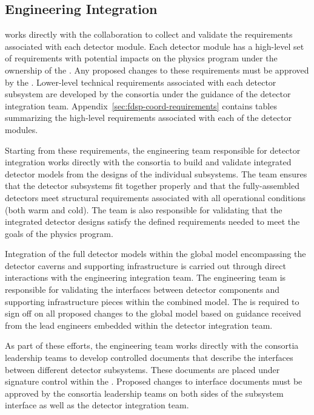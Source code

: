 \subsection{Engineering Integration}

  works directly with the collaboration to
collect and validate the requirements associated with each detector
module.  Each detector module has a high-level set of requirements
with potential impacts on the  physics program under
the ownership of the  .  Any proposed
changes to these requirements must be approved by the .
Lower-level technical requirements associated with each detector
subsystem are developed by the consortia under the guidance of
the  detector integration team.  Appendix~\ref{sec:fdsp-coord-requirements}
contains tables summarizing the high-level requirements associated
with each of the detector modules.

Starting from these requirements, the  engineering
team responsible for detector integration works directly with the
 consortia to build and validate integrated detector
models from the designs of the individual subsystems.  The team
ensures that the detector subsystems fit together properly and
that the fully-assembled detectors meet structural requirements
associated with all operational conditions (both warm and cold).
The team is also responsible for validating that the integrated
detector designs satisfy the defined requirements needed to meet
the goals of the  physics program.

Integration of the full detector models within the global model
encompassing the detector caverns and supporting infrastructure
is carried out through direct interactions with the 
engineering integration team.  The  engineering team
is responsible for validating the interfaces between 
detector components and supporting infrastructure pieces within
the combined model.  The  is required to sign off
on all proposed changes to the global model based on guidance
received from the lead engineers embedded within the 
detector integration team.

As part of these efforts, the engineering team works directly
with the consortia leadership teams to develop controlled
documents that describe the interfaces between different detector
subsystems.  These documents are placed under signature control
within the  
.  Proposed changes to interface documents must be approved
by the consortia leadership teams on both sides of the subsystem
interface as well as the  detector integration team.

